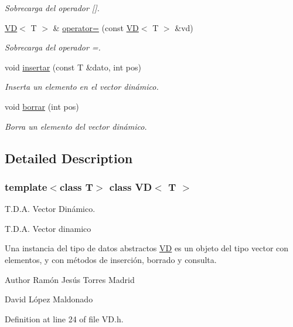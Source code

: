 \begin{DoxyCompactItemize}
\begin{DoxyCompactList}\small\item\em Sobrecarga del operador \mbox{[}\mbox{]}. \end{DoxyCompactList}\item 
\hyperlink{classVD}{VD}$<$ T $>$ \& \hyperlink{classVD_a5f3f80d38810a3d6c10953606ee47447}{operator=} (const \hyperlink{classVD}{VD}$<$ T $>$ \&vd)
\begin{DoxyCompactList}\small\item\em Sobrecarga del operador =. \end{DoxyCompactList}\item 
void \hyperlink{classVD_a10bba26b426aa83456437543d794b429}{insertar} (const T \&dato, int pos)
\begin{DoxyCompactList}\small\item\em Inserta un elemento en el vector dinámico. \end{DoxyCompactList}\item 
void \hyperlink{classVD_a56e6ae22f6c89d7f9f46412d4e2121a0}{borrar} (int pos)
\begin{DoxyCompactList}\small\item\em Borra un elemento del vector dinámico. \end{DoxyCompactList}\end{DoxyCompactItemize}


\subsection{Detailed Description}
\subsubsection*{template$<$class T$>$\newline
class V\+D$<$ T $>$}

T.\+D.\+A. Vector Dinámico. 

T.\+D.\+A. Vector dinamico

Una instancia  del tipo de datos abstractos {\ttfamily \hyperlink{classVD}{VD}} es un objeto del tipo vector con elementos, y con métodos de inserción, borrado y consulta.

\begin{DoxyAuthor}{Author}
Ramón Jesús Torres Madrid 

David López Maldonado 
\end{DoxyAuthor}


Definition at line 24 of file V\+D.\+h.



